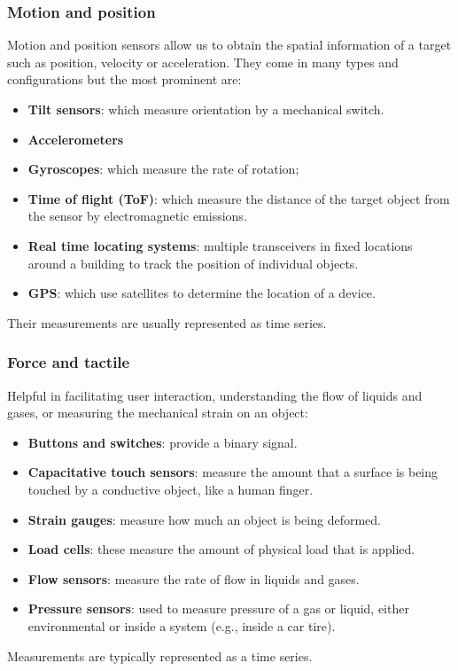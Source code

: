 \documentclass{article}
\begin{document}
        \subsubsection{Motion and position} %
          Motion and position sensors allow us to obtain the spatial information of a target such as position, velocity or acceleration. They come in many types and configurations but the most prominent are: 
          \begin{itemize}
            \item \textbf{Tilt sensors}: which measure orientation by a mechanical switch.
            \item \textbf{Accelerometers}
            \item \textbf{Gyroscopes}: which measure the rate of rotation;
            \item \textbf{Time of flight (ToF)}: which measure the distance of the target object from the sensor by electromagnetic emissions.
            \item \textbf{Real time locating systems}: multiple transceivers in fixed locations around a building to track the position of individual objects.
            \item \textbf{GPS}: which use satellites to determine the location of a device.
          \end{itemize}
          Their measurements are usually represented as time series.

        \subsubsection{Force and tactile}
          Helpful in facilitating user interaction, understanding the flow of liquids and gases, or
          measuring the mechanical strain on an object:
          \begin{itemize}
            \item \textbf{Buttons and switches}: provide a binary signal.
            \item \textbf{Capacitative touch sensors}: measure the amount that a surface is being touched by a conductive object, like a human finger.
            \item \textbf{Strain gauges}: measure how much an object is being deformed.
            \item \textbf{Load cells}: these measure the amount of physical load that is applied.
            \item \textbf{Flow sensors}: measure the rate of flow in liquids and gases.
            \item \textbf{Pressure sensors}: used to measure pressure of a gas or liquid, either environmental or inside a system (e.g., inside a car tire).
          \end{itemize}
          Measurements are typically represented as a time series.
\end{document}
